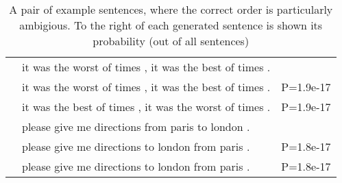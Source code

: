 \documentclass[class=article]{standalone}
\begin{document}
	
	\begin{table*}
		\small
		\begin{tabular}{ p{\collenone} p{\collentwo} p{\collenthree} }
			
			\textbf{}  & it was the worst of times , it was the best of times . &  \\
			\textbf{\oracletitle}  & it was the worst of times , it was the best of times . & P=1.9e-17 \\
			\textbf{\twosteptitle}  & it was the best of times , it was the worst of times . & P=1.9e-17 \\
			\hline
			\textbf{}  & please give me directions from paris to london . &  \\
			\textbf{\oracletitle}  & please give me directions to london from paris . & P=1.8e-17 \\
			\textbf{\twosteptitle}  & please give me directions to london from paris . & P=1.8e-17 \\
			\hline
		\end{tabular}
		\caption{    \label{egordered} A pair of example sentences, where the correct order is particularly ambigious.    To the right of each generated sentence is shown its probability (out of all sentences)}
	\end{table*}
	
	
	
	
	
	
\end{document}
